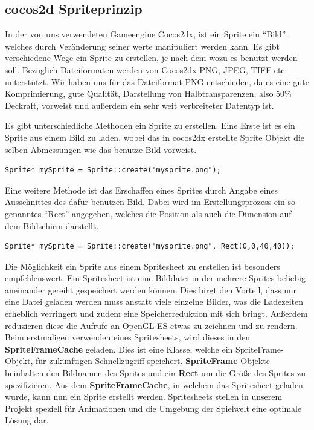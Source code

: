 \subsection{cocos2d Spriteprinzip}
In der von uns verwendeten Gameengine Cocos2dx, ist ein Sprite ein “Bild”, welches durch Veränderung seiner werte manipuliert werden kann. Es gibt verschiedene Wege ein Sprite zu erstellen, je nach dem wozu es benutzt werden soll. Bezüglich Dateiformaten werden von Cocos2dx PNG, JPEG, TIFF etc. unterstützt. Wir haben uns für das Dateiformat PNG entschieden, da es eine gute Komprimierung, gute Qualität, Darstellung von Halbtransparenzen, also 50\% Deckraft, vorweist und außerdem ein sehr weit verbreiteter Datentyp ist.

Es gibt unterschiedliche Methoden ein Sprite zu erstellen. Eine Erste ist es ein Sprite aus einem Bild zu laden, wobei das in cocos2dx erstellte Sprite Objekt die selben Abmessungen wie das benutze Bild vorweist. 

\begin{lstlisting}[style=singleline]
Sprite* mySprite = Sprite::create("mysprite.png");
\end{lstlisting}

Eine weitere Methode ist das Erschaffen eines Sprites durch Angabe eines Ausschnittes des dafür benutzen Bild. Dabei wird im Erstellungsprozess ein so genanntes “Rect” angegeben, welches die Position als auch die Dimension auf dem Bildschirm darstellt. 

\begin{lstlisting}[style=singleline]
Sprite* mySprite = Sprite::create("mysprite.png", Rect(0,0,40,40));
\end{lstlisting}

Die Möglichkeit ein Sprite aus einem Spritesheet zu erstellen ist besonders empfehlenswert. Ein Spritesheet ist eine Bilddatei in der mehrere Sprites beliebig aneinander gereiht gespeichert werden können. Dies birgt den Vorteil, dass nur eine Datei geladen werden muss anstatt viele einzelne Bilder, was die Ladezeiten erheblich verringert und zudem eine Speicherreduktion mit sich bringt. Außerdem reduzieren diese die Aufrufe an OpenGL ES etwas zu zeichnen und zu rendern. Beim erstmaligen verwenden eines Spritesheets, wird dieses in den \textbf{SpriteFrameCache} geladen.  Dies ist eine Klasse, welche ein SpriteFrame-Objekt, für zukünftigen Schnellzugriff speichert. \textbf{SpriteFrame}-Objekte beinhalten den Bildnamen des Sprites und ein \textbf{Rect} um die Größe des Sprites zu spezifizieren. Aus dem \textbf{SpriteFrameCache}, in welchem das Spritesheet geladen wurde, kann nun ein Sprite erstellt werden.
Spritesheets stellen in unserem Projekt speziell für Animationen und die Umgebung der Spielwelt eine optimale Lösung dar. 



